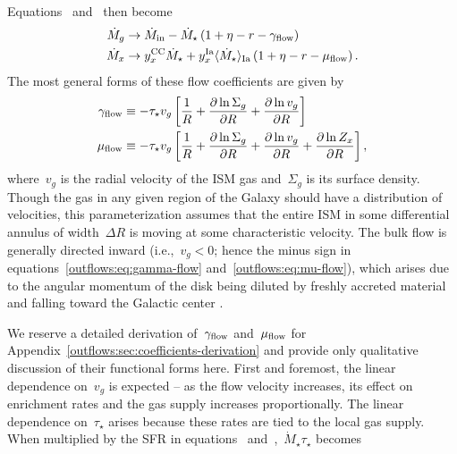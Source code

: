 Equations~
and~ then become
\begin{subequations}\begin{align}
\dot{M}_{g} &\rightarrow \dot{M}_\text{in} - \dot{M}_\star
\left(1 + \eta - r - \gamma_{\text{flow}}\right)
\\
\dot{M}_x &\rightarrow y_\text{$x$}^\text{CC} \dot{M}_\star +
y_\text{$x$}^\text{Ia} \langle \dot{M}_\star \rangle_\text{Ia}
\left(1 + \eta - r - \mu_{\text{flow}}\right).
\end{align}\end{subequations}
The most general forms of these flow coefficients are given by
\begin{subequations}\begin{align}
\gamma_{\text{flow}} &\equiv -\tau_\star v_g \left[
\frac{1}{R} +
\frac{\partial \ln \Sigma_g}{\partial R} +
\frac{\partial \ln v_g}{\partial R}
\right]
\label{outflows:eq:gamma-flow-general}
\\
\mu_{\text{flow}} &\equiv -\tau_\star v_g \left[
\frac{1}{R} + \frac{\partial \ln \Sigma_g}{\partial R} +
\frac{\partial \ln v_g}{\partial R} +
\frac{\partial \ln Z_x}{\partial R}
\right],
\label{outflows:eq:mu-flow-general}
\end{align}\end{subequations}
where~$v_g$ is the radial velocity of the ISM gas and~$\Sigma_g$ is its surface
density.
Though the gas in any given region of the Galaxy should have a distribution of
velocities, this parameterization assumes that the entire ISM in some
differential annulus of width~$\Delta R$ is moving at some characteristic
velocity.
The bulk flow is generally directed inward (i.e.,~$v_g < 0$; hence the minus
sign in equations~\ref{outflows:eq:gamma-flow} and~\ref{outflows:eq:mu-flow}),
which arises due to the angular momentum of the disk being diluted by freshly
accreted material and falling toward the Galactic center
\citep[see discussion in, e.g.,][]{Bilitewski2012}.
\par
We reserve a detailed derivation of~$\gamma_{\text{flow}}$ and~$\mu_{\text{flow}}$ for
Appendix~\ref{outflows:sec:coefficients-derivation} and provide only
qualitative discussion of their functional forms here.
First and foremost, the linear dependence on~$v_g$ is expected -- as the flow
velocity increases, its effect on enrichment rates and the gas supply increases
proportionally.
The linear dependence on~$\tau_\star$ arises because these rates are tied to
the local gas supply.
When multiplied by the SFR in equations~
and~,~$\dot{M}_\star \tau_\star$ becomes
